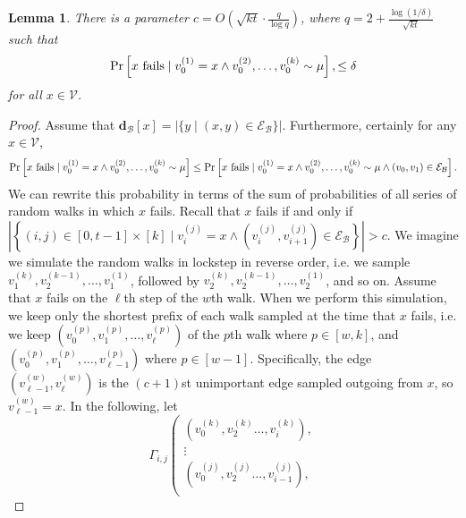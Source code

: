 \documentclass{report}
\newtheorem{lemma}[theorem]{Lemma}
\begin{document}
\begin{lemma} \label{lem:rw:setc}
There is a parameter $c = O\left (\sqrt{kt} \cdot \frac{q}{\log q} \right )$, where $q = 2 + \frac{\log(1/\delta)}{\sqrt{kt}}$ such that 
%
\begin{equation*}
\Pr \left [\textnormal{$x$ fails} \mid v_0^{(1)} = x \wedge v_0^{(2)}, \dots, v_0^{(k)} \sim \mu \right ], \leq \delta
\end{equation*}
%
for all $x \in \mathcal{V}$.
\end{lemma}
%
\begin{proof}
Assume that $\mathbf{d}_\mathcal{B}[x] = |\{y \mid (x, y) \in \mathcal{E}_\mathcal{B}\}|$.
Furthermore, certainly for any $x \in \mathcal{V}$,
%
\begin{equation*}
\Pr \left [\textnormal{$x$ fails} \mid v_0^{(1)} = x \wedge v_0^{(2)}, \dots, v_0^{(k)} \sim \mu \right ]
\leq 
\Pr \left [\textnormal{$x$ fails} \mid v_0^{(1)} = x \wedge v_0^{(2)}, \dots, v_0^{(k)} \sim \mu \wedge (v_0, v_1) \in \mathcal{E}_\mathcal{B} \right ].
\end{equation*}
%
We can rewrite this probability in terms of the sum of probabilities of all series of random walks in which $x$ fails.  
Recall that $x$ fails if and only if 
$\left | \left \{ (i,j) \in [0, t - 1] \times [k] \mid v_i^{(j)} = x 
	\wedge \left ( v_i^{(j)}, v_{i+1}^{(j)} \right ) \in \mathcal{E}_\mathcal{B} \right \} \right | > c$.
We imagine we simulate the random walks in lockstep in reverse order, i.e. we sample $v_1^{(k)}, v_2^{(k-1)}, \dots, v_1^{(1)}$, followed by $v_2^{(k)}, v_2^{(k-1)}, \dots, v_2^{(1)}$, and so on.
Assume that $x$ fails on the $\ell$th step of the $w$th walk.
When we perform this simulation, we keep only the shortest prefix of each walk sampled at the time that $x$ fails, i.e. we keep $\left (v_0^{(p)}, v_1^{(p)},  \dots, v_\ell^{(p)} \right )$ of the $p$th walk where $p \in [w, k]$, and $\left (v_0^{(p)}, v_1^{(p)},  \dots, v_{\ell-1}^{(p)} \right )$ where $p \in [w-1]$. 
Specifically, the edge $\left ( v_{\ell-1}^{(w)}, v_{\ell}^{(w)} \right )$ is the $(c+1)$st unimportant edge sampled outgoing from $x$, so $v_{\ell-1}^{(w)} = x$.
In the following, let 
%
\begin{equation} \label{eq:rw:gamma}
\Gamma_{i, j} \left ( {\substack{
	\left (v_0^{(k)}, v_2^{(k)} \dots, v_i^{(k)} \right ), \\
	\vdots \\
	\left (v_0^{(j)}, v_2^{(j)} \dots, v_{i-1}^{(j)} \right ), \\
}}
\end{equation}
\end{proof}
\end{document}
